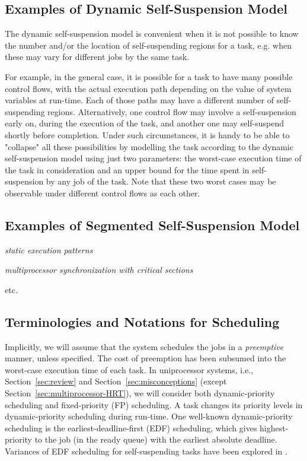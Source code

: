 \subsection{Examples of Dynamic Self-Suspension Model} 
The dynamic self-suspension model is convenient when it is not possible to know  the number and/or the location of self-suspending regions for a task, e.g. when these may vary for different jobs by the same task.

For example, in the general case, it is possible for a task to have many possible control flows, with the actual execution path depending on the value
of system variables at run-time. Each of those paths may have a different
number of self-suspending regions. Alternatively, one control flow may involve a self-suspension early on, during the execution of the task, and
another one may self-suspend shortly before completion. Under such circumstances, it is handy to be able to "collapse" all these possibilities
by modelling the task according to the dynamic self-suspension model using
just two parameters: the worst-case execution time of the task in consideration and an upper bound for the time spent in self-suspension by any job of the task. Note that these two worst cases may be observable under different control flows as each other.
  
\subsection{Examples of Segmented Self-Suspension Model} 
  \textit{static execution patterns}
  
  \textit{multiprocessor synchronization with critical sections}
 
  etc.
  
\subsection{Terminologies and Notations for Scheduling}

Implicitly, we will assume that the system schedules the jobs in a
\emph{preemptive} manner, unless specified.  The cost of preemption
has been subsumed into the worst-case execution time of each task. In
uniprocessor systems, i.e., Section~\ref{sec:review} and
Section~\ref{sec:misconceptions} (except Section~\ref{sec:multiprocessor-HRT}), we will consider both
dynamic-priority scheduling and fixed-priority (FP)
scheduling. A task changes its priority levels in dynamic-priority
scheduling during run-time. One well-known dynamic-priority scheduling
is the earliest-deadline-first (EDF) scheduling, which gives
highest-priority to the job (in the ready queue) with the earliest
absolute deadline. Variances of EDF scheduling for self-suspending
tasks have been explored in
\cite{RTSS-ChenL14,Liu_2014,DBLP:conf/ecrts/Devi03,WC16-suspend-DATE}.

